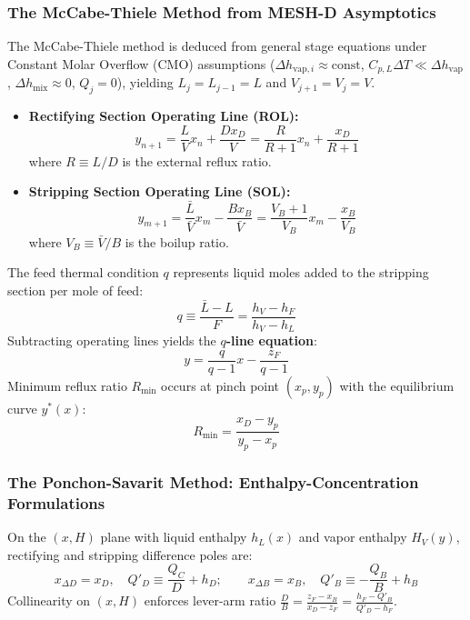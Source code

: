 \documentclass[11pt,a4paper]{article}
\begin{document}
\subsubsection{The McCabe-Thiele Method from MESH-D Asymptotics}
The McCabe-Thiele method is deduced from general stage equations under Constant Molar Overflow (CMO) assumptions ($\Delta h_{\text{vap},i} \approx \text{const}$, $C_{p,L} \Delta T \ll \Delta h_{\text{vap}}$, $\Delta h_{\text{mix}} \approx 0$, $Q_j = 0$), yielding $L_j = L_{j-1} = L$ and $V_{j+1} = V_j = V$.

\begin{itemize}[leftmargin=*]
    \item \textbf{Rectifying Section Operating Line (ROL):}
    \begin{equation}
    y_{n+1} = \frac{L}{V} x_n + \frac{D x_D}{V} = \frac{R}{R + 1} x_n + \frac{x_D}{R + 1}
    \end{equation}
    where $R \equiv L/D$ is the external reflux ratio.
    \item \textbf{Stripping Section Operating Line (SOL):}
    \begin{equation}
    y_{m+1} = \frac{\bar{L}}{\bar{V}} x_m - \frac{B x_B}{\bar{V}} = \frac{V_B + 1}{V_B} x_m - \frac{x_B}{V_B}
    \end{equation}
    where $V_B \equiv \bar{V}/B$ is the boilup ratio.
\end{itemize}

The feed thermal condition $q$ represents liquid moles added to the stripping section per mole of feed:
\begin{equation}
q \equiv \frac{\bar{L} - L}{F} = \frac{h_V - h_F}{h_V - h_L}
\end{equation}
Subtracting operating lines yields the \textbf{$q$-line equation}:
\begin{equation}
y = \frac{q}{q - 1} x - \frac{z_F}{q - 1}
\end{equation}
Minimum reflux ratio $R_{\min}$ occurs at pinch point $(x_p, y_p)$ with the equilibrium curve $y^*(x)$:
\begin{equation}
R_{\min} = \frac{x_D - y_p}{y_p - x_p}
\end{equation}

\subsubsection{The Ponchon-Savarit Method: Enthalpy-Concentration Formulations}
On the $(x, H)$ plane with liquid enthalpy $h_L(x)$ and vapor enthalpy $H_V(y)$, rectifying and stripping difference poles are:
\begin{equation}
x_{\Delta D} = x_D, \quad Q'_D \equiv \frac{Q_C}{D} + h_D; \qquad x_{\Delta B} = x_B, \quad Q'_B \equiv -\frac{Q_B}{B} + h_B
\end{equation}
Collinearity on $(x, H)$ enforces lever-arm ratio $\frac{D}{B} = \frac{z_F - x_B}{x_D - z_F} = \frac{h_F - Q'_B}{Q'_D - h_F}$.
\end{document}
